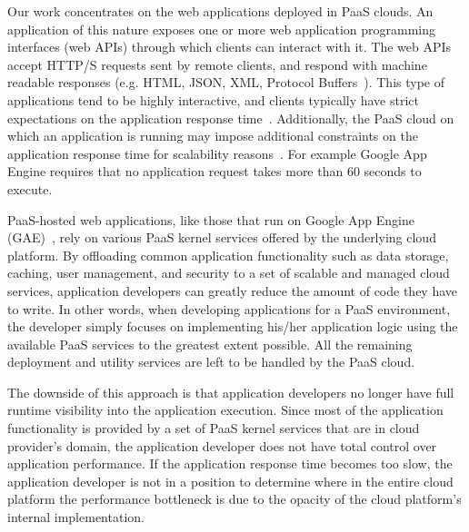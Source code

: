

Our work concentrates on the web
applications deployed in PaaS clouds. An application of this nature exposes
one or more web application programming interfaces (web APIs) through which
clients can interact with it. The web APIs accept HTTP/S requests sent by
remote clients, and respond with machine readable responses (e.g. HTML, JSON,
XML, Protocol Buffers~\cite{protobuff}). This type of applications tend to be highly
interactive, and clients typically have strict expectations on the application
response time~\cite{latency-matters}. 
Additionally, the PaaS cloud on
which an application is running may impose additional constraints on the
application response time for scalability
reasons~\cite{azure-limits,gae-limits}.  For example Google App Engine
requires that no application request takes more than 60 seconds to execute.

PaaS-hosted web applications, like those that run on Google App Engine
(GAE)~\cite{gae},  
rely on various PaaS kernel services offered by the underlying
cloud platform. 
By offloading common application functionality such as data storage, caching,
user management, and security to a set of scalable and
managed cloud services, application developers
can greatly reduce the amount of code they have to write. 
In other words, when developing applications for a PaaS environment, the
developer simply focuses on implementing his/her application logic
using the available PaaS services to the greatest extent possible.
All the remaining deployment and utility services are left to be handled 
by the PaaS cloud. 

The downside of this approach is that application developers no longer have full runtime visibility
into the application execution. Since most of the application functionality is provided by a set 
of PaaS kernel services that are in cloud provider's domain, the application
developer does not have total control over application performance. If the application 
response time becomes too slow, the application developer is not in a position to determine
where in the entire cloud platform the performance bottleneck is due to the opacity of the cloud
platform's internal implementation. 

